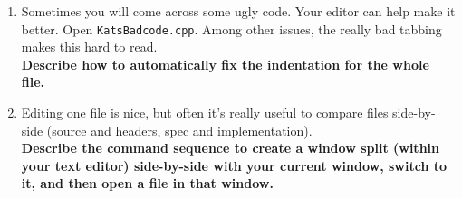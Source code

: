 \documentclass{article}
\begin{document}
\begin{enumerate}
  \item Sometimes you will come across some ugly code. Your editor can help
    make it better. Open \texttt{KatsBadcode.cpp}. Among other issues, the
    really bad tabbing makes this hard to read.\\
    \textbf{Describe how to automatically fix the indentation for the whole file.}
    \vspace{6em}
  \item Editing one file is nice, but often it's really useful to compare
    files side-by-side (source and headers, spec and implementation).\\
    \textbf{Describe the command sequence to create a window split (within your
        text editor) side-by-side with your current window, switch to it, and then open a file in that window.}\\
    \vspace{6em}


\end{enumerate}
\end{document}
